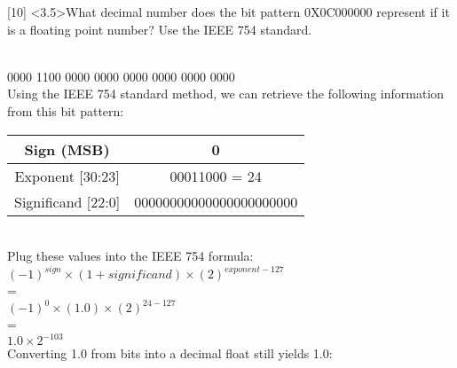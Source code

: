\documentclass[12pt]{article}
\begin{document}
	
	
	
	
	\newpage
	
	
	
	
	
	\noindent {} 
	[10] \textless3.5\textgreater What decimal number does the bit pattern 0X0C000000 represent if it is a floating point number? Use the IEEE 754 standard. \vspace{0.15cm} \\
	
	\begin{center}
		\vspace{0.3cm}\\
		0000 1100 0000 0000 0000 0000 0000 0000  \vspace{0.3cm}\\
		
		Using the IEEE 754 standard method, we can retrieve the following information from this bit pattern: \vspace{0.3cm}
		
		\begin{tabular}{ |c|c| } 
			\hline
			Sign (MSB) & 0 \\
			\hline
			Exponent [30:23] & 00011000 = 24 \\
			\hline
			Significand [22:0] & 00000000000000000000000 \\
			\hline
		\end{tabular}
		\vspace{0.6cm} \\
		
		Plug these values into the IEEE 754 formula: \vspace{0.3cm} \\ 
		
		$(-1)^{sign}\times(1+significand)\times(2)^{exponent - 127}$ \vspace{0.3cm} \\
		
		= \vspace{0.3cm} \\
		
		$(-1)^{0}\times(1.0)\times(2)^{24 - 127}$ \vspace{0.3cm} \\
		
		= \vspace{0.3cm} \\
		
		$1.0 \times 2^{-103}$ \vspace{0.3cm} \\
		
		Converting 1.0 from bits into a decimal float still yields 1.0: \vspace{0.3cm} \\
		
		
		
	\end{center}
	
\end{document}
